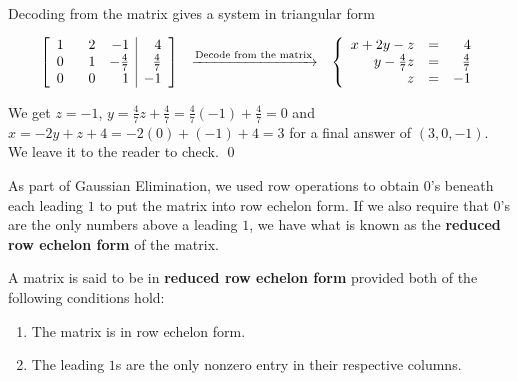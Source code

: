 \begin{ex}
\[\begin{array}{ccc}
\end{array}\]

Decoding from the matrix gives a system in triangular form

\[ \begin{array}{ccc}

\left[ \begin{array}{rrr|r} 
1 & \hphantom{-}2 & -1 & 4 \\ 
0 & 1 & -\frac{4}{7} & \frac{4}{7} \\ 
0 & 0 &1 & -1 \\ 
\end{array} \right]  
& 
\xrightarrow{\text{Decode from the matrix}} 
& 
\left \{ \begin{array}{rcr} 
x + 2y-z & = & 4 \\ 
y - \frac{4}{7} z & = & \frac{4}{7} \\ 
z & = & -1 \end{array} \right.

\end{array}\]

We get $z=-1$,  $y = \frac{4}{7} z + \frac{4}{7} = \frac{4}{7}(-1)+\frac{4}{7} = 0$ and $x = -2y+z+4 = -2(0)+(-1)+4 = 3$ for a final answer of $(3,0,-1)$.  We leave it to the reader to check. \qed

\end{ex}

As part of Gaussian Elimination, we used row operations to obtain $0$'s beneath each leading $1$ to put the matrix into row echelon form.  If we also require that $0$'s are the only numbers above a leading $1$, we have what is known as  the   \textbf{reduced row echelon form} of the matrix.

\smallskip

\colorbox{ResultColor}{\bbm  

\begin{defn} \label{reducedrowechelonform} A matrix is said to be in \textbf{reduced row echelon form} provided both of the following conditions hold:

\begin{enumerate}

\item  The matrix is in row echelon form.

\item The leading $1$s are the only nonzero entry in their respective columns.

\end{enumerate}

\end{defn}

\ebm}

